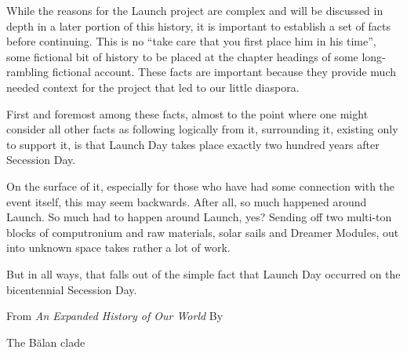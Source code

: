   While the reasons for the Launch project are complex and will be discussed in depth in a later portion of this history, it is important to establish a set of facts before continuing. This is no “take care that you first place him in his time”, some fictional bit of history to be placed at the chapter headings of some long-rambling fictional account. These facts are important because they provide much needed context for the project that led to our little diaspora.

  First and foremost among these facts, almost to the point where one might consider all other facts as following logically from it, surrounding it, existing only to support it, is that Launch Day takes place exactly two hundred years after Secession Day.

  On the surface of it, especially for those who have had some connection with the event itself, this may seem backwards. After all, so much happened around Launch. So much had to happen around Launch, yes? Sending off two multi-ton blocks of computronium and raw materials, solar sails and Dreamer Modules, out into unknown space takes rather a lot of work.

  But in all ways, that falls out of the simple fact that Launch Day occurred on the bicentennial Secession Day.

  \vspace{1em}
  
  From \emph{An Expanded History of Our World} By

  The Bălan clade

  \vfill
  



%

